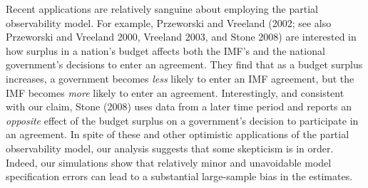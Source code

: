 \documentclass[10pt]{article}
\begin{document}
Recent applications are relatively sanguine about employing the partial observability model. 
For example, Przeworski and Vreeland (2002; see also Przeworski and Vreeland 2000, Vreeland 2003, and Stone 2008) are interested in how surplus in a nation's budget affects both the IMF's and the national government's decisions to enter an agreement.
They find that as a budget surplus increases, a government becomes \textit{less} likely to enter an IMF agreement, but the IMF becomes \textit{more} likely to enter an agreement.
Interestingly, and consistent with our claim, Stone (2008) uses data from a later time period and reports an \textit{opposite} effect of the budget surplus on a government's decision to participate in an agreement.
In spite of these and other optimistic applications of the partial observability model, our analysis suggests that some skepticism is in order. 
Indeed, our simulations show that relatively minor and unavoidable model specification errors can lead to a substantial large-sample bias in the estimates.

\singlespace
\end{document}
